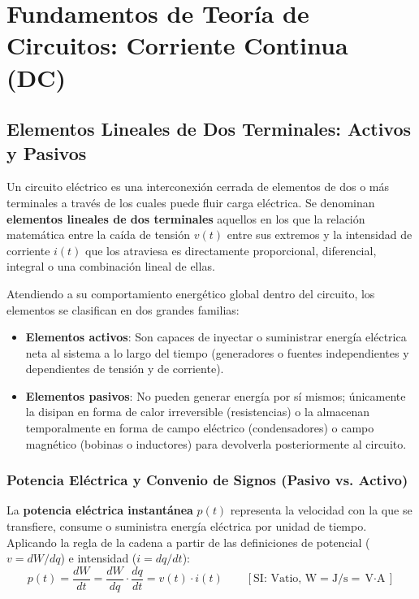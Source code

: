 \chapter{Fundamentos de Teoría de Circuitos: Corriente Continua (DC)}

\section{Elementos Lineales de Dos Terminales: Activos y Pasivos}

Un circuito eléctrico es una interconexión cerrada de elementos de dos o más terminales a través de los cuales puede fluir carga eléctrica. Se denominan \textbf{elementos lineales de dos terminales} aquellos en los que la relación matemática entre la caída de tensión $v(t)$ entre sus extremos y la intensidad de corriente $i(t)$ que los atraviesa es directamente proporcional, diferencial, integral o una combinación lineal de ellas.

Atendiendo a su comportamiento energético global dentro del circuito, los elementos se clasifican en dos grandes familias:
\begin{itemize}
    \item \textbf{Elementos activos}: Son capaces de inyectar o suministrar energía eléctrica neta al sistema a lo largo del tiempo (generadores o fuentes independientes y dependientes de tensión y de corriente).
    \item \textbf{Elementos pasivos}: No pueden generar energía por sí mismos; únicamente la disipan en forma de calor irreversible (resistencias) o la almacenan temporalmente en forma de campo eléctrico (condensadores) o campo magnético (bobinas o inductores) para devolverla posteriormente al circuito.
\end{itemize}

\subsection{Potencia Eléctrica y Convenio de Signos (Pasivo vs. Activo)}

La \textbf{potencia eléctrica instantánea} $p(t)$ representa la velocidad con la que se transfiere, consume o suministra energía eléctrica por unidad de tiempo. Aplicando la regla de la cadena a partir de las definiciones de potencial ($v = dW/dq$) e intensidad ($i = dq/dt$):
\begin{equation}
    p(t) = \frac{dW}{dt} = \frac{dW}{dq}\cdot\frac{dq}{dt} = v(t)\cdot i(t) \qquad [\text{SI: Vatio, }\si{\watt} = \si{\joule/\second} = \si{\volt\cdot\ampere}]
\end{equation}

